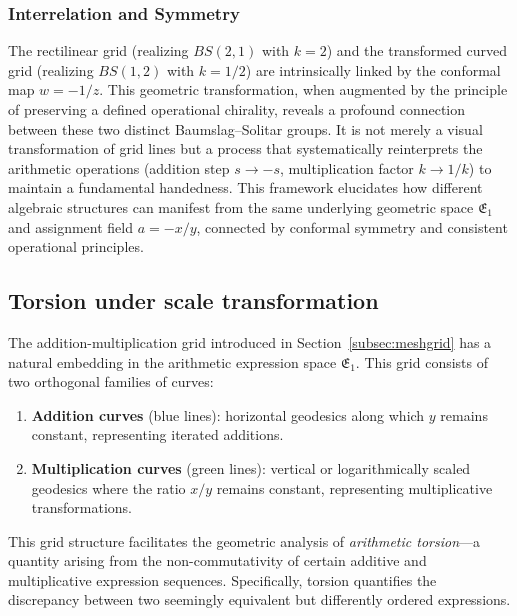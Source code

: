\subsubsection{Interrelation and Symmetry}
The rectilinear grid (realizing $BS(2,1)$ with $k=2$) and the transformed curved grid (realizing $BS(1,2)$ with $k=1/2$) are intrinsically linked by the conformal map $w=-1/z$. This geometric transformation, when augmented by the principle of preserving a defined operational chirality, reveals a profound connection between these two distinct Baumslag--Solitar groups. It is not merely a visual transformation of grid lines but a process that systematically reinterprets the arithmetic operations (addition step $s \to -s$, multiplication factor $k \to 1/k$) to maintain a fundamental handedness. This framework elucidates how different algebraic structures can manifest from the same underlying geometric space $\mathfrak{E}_1$ and assignment field $a=-x/y$, connected by conformal symmetry and consistent operational principles.

\subsection{Torsion under scale transformation}\label{subsec:gridsandtorsion}

The addition-multiplication grid introduced in Section~\ref{subsec:meshgrid} has a natural embedding in the arithmetic expression space $\mathfrak{E}_1$. This grid consists of two orthogonal families of curves:

\begin{enumerate}
    \item \textbf{Addition curves} (blue lines): horizontal geodesics along which $y$ remains constant, representing iterated additions.
    \item \textbf{Multiplication curves} (green lines): vertical or logarithmically scaled geodesics where the ratio $x/y$ remains constant, representing multiplicative transformations.
\end{enumerate}

This grid structure facilitates the geometric analysis of \emph{arithmetic torsion}—a quantity arising from the non-commutativity of certain additive and multiplicative expression sequences. Specifically, torsion quantifies the discrepancy between two seemingly equivalent but differently ordered expressions.

